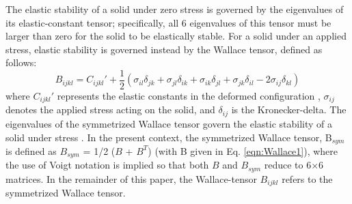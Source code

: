 \documentclass[showpacs,aps,floatfix,prb,reprint,superscriptaddress]{revtex4-1}
\begin{document}
The elastic stability of a solid under zero stress is governed by the eigenvalues of its elastic-constant tensor; specifically, all 6 eigenvalues of this tensor must be larger than zero for the solid to be elastically stable. For a solid under an applied stress, elastic stability is governed instead by the Wallace tensor, defined as follows:
\begin{equation}
\label{eqn:Wallace1}
B_{ijkl} = C_{ijkl}' + \frac{1}{2} \left(\sigma_{il} \delta_{jk} + \sigma_{jl} \delta_{ik} + \sigma_{ik} \delta_{jl} + \sigma_{jk} \delta_{il} - 2\sigma_{ij} \delta_{kl} \right)
\end{equation}
where $C_{ijkl}'$ represents the elastic constants in the deformed configuration \cite{wallace1998thermodynamics,ray1988elastic,wang1993crystal}, $\sigma_{ij}$ denotes the applied stress acting on the solid, and $\delta_{ij}$ is the Kronecker-delta. The eigenvalues of the symmetrized Wallace tensor govern the elastic stability of a solid under stress \cite{wang1995mechanical}. In the present context, the symmetrized Wallace tensor, B$_{sym}$ is defined as  $B_{sym}$ = 1/2 ($B$ + $B^{T}$) (with B given in Eq. \ref{eqn:Wallace1}), where the use of Voigt notation is implied so that both $B$ and $B_{sym}$ reduce to 6$\times$6 matrices. In the remainder of this paper, the Wallace-tensor $B_{ijkl}$ refers to the symmetrized Wallace tensor. 
\end{document}
